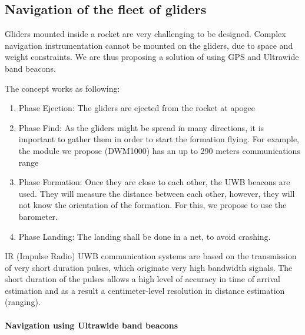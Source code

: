 \subsection{Navigation of the fleet of gliders}

Gliders mounted inside a rocket are very challenging to be designed. 
Complex navigation instrumentation cannot be mounted on the gliders, due to space and weight constraints. 
We are thus proposing a solution of using GPS and Ultrawide band beacons.

The concept works as following:

\begin{enumerate}
    \item Phase Ejection: The gliders are ejected from the rocket at apogee
    \item Phase Find: As the gliders might be spread in many directions, it is important to gather them in order to start the formation flying. For example, the module we propose (DWM1000) has an up to 290 meters communications range
    \item Phase Formation: Once they are close to each other, the UWB beacons are used. They will measure the distance between each other, however, they will not know the orientation of the formation. For this, we propose to use the barometer.
    \item Phase Landing: The landing shall be done in a net, to avoid crashing.
\end{enumerate}


IR (Impulse Radio) UWB communication systems are based on the transmission of very short duration pulses, which originate very high bandwidth signals. The short duration of the pulses allows a high level of accuracy in time of arrival estimation and as a result a centimeter-level resolution in distance estimation (ranging).





\paragraph{Navigation using Ultrawide band beacons}
\hfill \break




